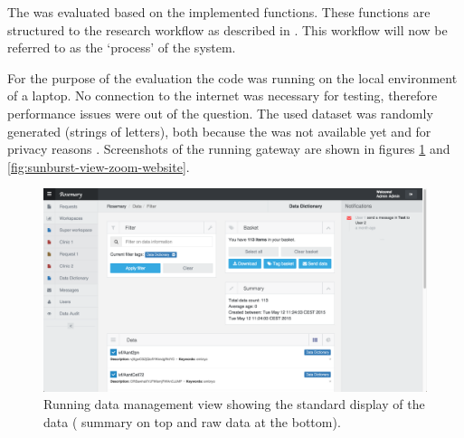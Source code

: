 The \ivfsystem{} was evaluated based on the implemented functions.
These functions are structured to the research workflow as described in . This workflow will now be referred to as the `process' of the system.


For the purpose of the evaluation the \ivfsystem{} code was running on the local environment of a laptop.
No connection to the internet was necessary for testing, therefore performance issues were out of the question.
The used dataset was randomly generated (strings of letters), both because the \projectdata{} was not available yet and for privacy reasons .
Screenshots of the running gateway are shown in figures \ref{fig:standard-view-website} and \ref{fig:sunburst-view-zoom-website}.

\begin{figure}[!b]
	\centering
	\includegraphics[width=1.0\linewidth]{images/standard-view}
	\caption{
		Running \ivfsystem{} data management view showing the standard display of the data (\ie{} summary on top and raw data at the bottom).
	}
	\label{fig:standard-view-website}
\end{figure}

